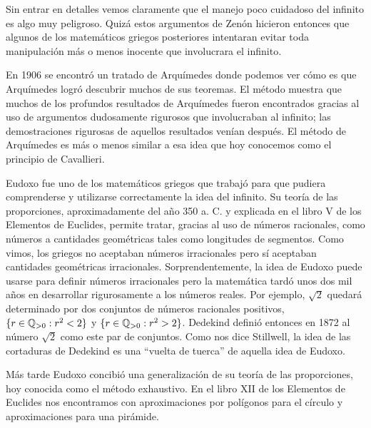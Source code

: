Sin entrar en detalles vemos claramente que el manejo poco cuidadoso del
infinito es algo muy peligroso. Quizá estos argumentos de Zenón hicieron
entonces que algunos de los matemáticos griegos posteriores intentaran evitar
toda manipulación más o menos inocente que involucrara el infinito.

En 1906 se encontró un tratado de Arquímedes donde podemos ver cómo es que
Arquímedes logró descubrir muchos de sus teoremas. El método muestra que muchos
de los profundos resultados de Arquímedes fueron encontrados gracias al uso de
argumentos dudosamente rigurosos que involucraban al infinito; las
demostraciones rigurosas de aquellos resultados venían después. El método de
Arquímedes es más o menos similar a esa idea que hoy conocemos como el principio
de Cavallieri.

Eudoxo fue uno de los matemáticos griegos que trabajó para que pudiera
comprenderse y utilizarse correctamente la idea del infinito. Su teoría de las
proporciones, aproximadamente del año 350 a. C. y explicada en el libro V de los
Elementos de Euclides, permite tratar, gracias al uso de números racionales,
como números a cantidades geométricas tales como longitudes de segmentos. Como
vimos, los griegos no aceptaban números irracionales pero sí aceptaban
cantidades geométricas irracionales. Sorprendentemente, la idea de Eudoxo puede
usarse para definir números irracionales pero la matemática tardó unos dos mil
años en desarrollar rigurosamente a los números reales. Por ejemplo, $\sqrt{2}$
quedará determinado por dos conjuntos de números racionales positivos,
$\{r\in\mathbb{Q}_{>0}:r^2<2\}$ y $\{r\in\mathbb{Q}_{>0}:r^2>2\}$. Dedekind definió entonces en
1872 al número $\sqrt{2}$ como este par de conjuntos. Como nos dice Stillwell,
la idea de las cortaduras de Dedekind es una ``vuelta de tuerca'' de aquella
idea de Eudoxo. 

Más tarde Eudoxo concibió una generalización de su teoría de las proporciones,
hoy conocida como el método exhaustivo. En el libro XII de los Elementos de
Euclides nos encontramos con aproximaciones por polígonos para el círculo y
aproximaciones para una pirámide. 

